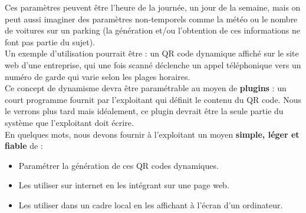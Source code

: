 \documentclass[a4paper,12pt]{article}
\begin{document}
\noindent Ces paramètres peuvent être l'heure de la journée, un jour de la semaine, mais on peut aussi imaginer des paramètres non-temporels comme la météo ou le nombre de voitures sur un parking (la génération et/ou l'obtention de ces informations ne font pas partie du sujet).\\

\noindent Un exemple d'utilisation pourrait être : un QR code dynamique affiché sur le site web d'une entreprise, qui une fois scanné déclenche un appel téléphonique vers un numéro de garde qui varie selon les plages horaires.\\

\noindent Ce concept de dynamisme devra être paramétrable au moyen de \textbf{plugins} : un court programme fournit par l'exploitant qui définit le contenu du QR code. Nous le verrons plus tard mais idéalement, ce plugin devrait être la seule partie du système que l'exploitant doit écrire.\\

\noindent En quelques mots, nous devons fournir à l'exploitant un moyen \textbf{simple, léger et fiable} de :
\begin{itemize}
\item Paramétrer la génération de ces QR codes dynamiques.
\item Les utiliser sur internet en les intégrant sur une page web.
\item Les utiliser dans un cadre local en les affichant à l'écran d'un ordinateur.\\
\end{itemize}
\end{document}
